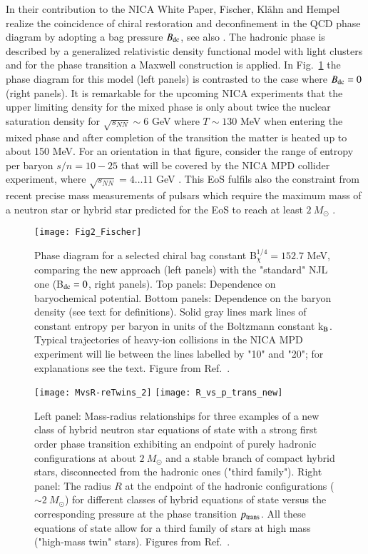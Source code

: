 \documentclass{webofc}
\begin{document}
In their contribution to the NICA White Paper, Fischer, Kl\"ahn and Hempel \cite{Fischer:2016ojn}
realize the coincidence of chiral restoration and deconfinement in the QCD phase diagram by adopting a bag pressure $B_{\rm dc}$, see also \cite{Klahn:2016uce}. 
The hadronic phase is described by a generalized relativistic density functional model with light clusters \cite{Typel:2009sy} and for the phase transition a Maxwell construction is applied.  In Fig.~\ref{fig-3} the phase diagram for this model (left panels) is contrasted to the case where  
$B_{\rm dc}=0$ (right panels). It is remarkable for the upcoming NICA experiments that the upper limiting density for the mixed phase is only about twice the nuclear saturation density for 
$\sqrt{s_{NN}}\sim 6$ GeV where $T\sim 130$ MeV when entering the mixed phase and after completion of the transition the matter is heated up to about 150 MeV.
For an orientation in that figure, consider the range of entropy per baryon $s/n=10 - 25$ 
\cite{Ivanov:2016hes} that will be covered by the NICA MPD collider experiment, where  
$\sqrt{s_{NN}} = 4 \dots 11$ GeV \cite{Kekelidze:2016hhw}. 
This EoS fulfils also the constraint from recent precise mass measurements of pulsars which require the maximum mass of a neutron star or hybrid star predicted for the EoS to reach at least  
$2~M_\odot$ \cite{Klahn:2015mfa}. 
%
\begin{figure}[!t]
\texttt{[image: Fig2\_Fischer]}
\caption{Phase diagram for a selected chiral bag constant B$^{1/4}_\chi = 152.7$ MeV, comparing 
the new approach \cite{Klahn:2016uce,Klahn:2015mfa} (left panels) with the "standard" NJL one 
(B$_{\rm dc} = 0$, right panels). 
Top panels: Dependence on baryochemical potential. Bottom panels: Dependence on the baryon density
(see text for definitions).
Solid gray lines mark lines of constant entropy per baryon in units of the Boltzmann constant k$_{\rm B}$.
Typical trajectories of heavy-ion collisions in the NICA MPD experiment will lie between the lines labelled by "10" and "20"; for explanations see the text. Figure from Ref.~\cite{Fischer:2016ojn}.}
\label{fig-3}       %
\end{figure}
%
\begin{figure}[!t]
\centering
\texttt{[image: MvsR-reTwins\_2]}
\texttt{[image: R\_vs\_p\_trans\_new]}
\caption{Left panel: Mass-radius relationships for three examples of a new class of hybrid neutron star equations of state with a strong first order phase transition exhibiting an endpoint of purely hadronic configurations at about $2~M_\odot$ and a stable branch of compact hybrid stars, disconnected from the hadronic ones ("third family"). 
Right panel: The radius $R$ at the endpoint of the hadronic configurations ($\sim 2~M_\odot$) for different 
classes of hybrid equations of state versus the corresponding pressure at the phase transition 
$p_{\rm trans}$. 
All these equations of state allow for a third family of stars at high mass ("high-mass twin" stars). 
Figures from Ref.~\cite{9}.
}
\label{fig-4}       %
\end{figure}
\end{document}
